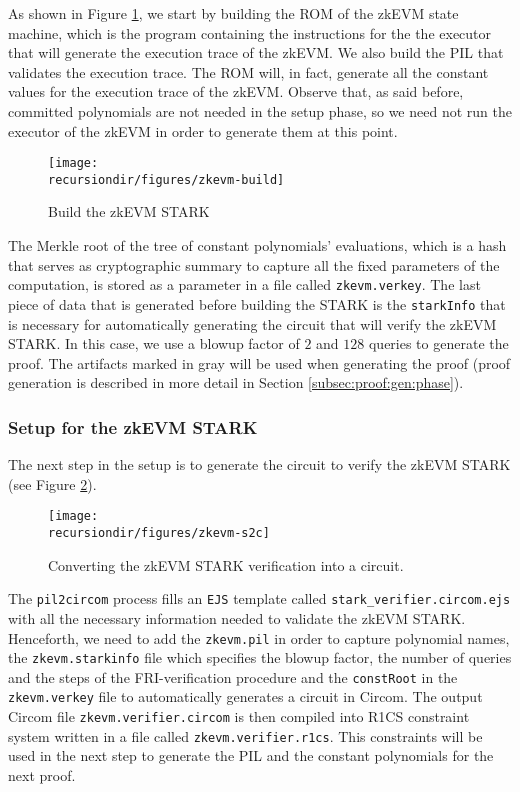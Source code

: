As shown in Figure \ref{fig:zkevm:build}, we start by building the ROM of the zkEVM state machine, which is the program containing the instructions for the the executor that will generate the execution trace of the zkEVM. We also build the PIL that validates the execution trace. The ROM will, in fact, generate all the constant values for the execution trace of the zkEVM. Observe that, as said before, committed polynomials are not needed in the setup phase, so we need not run the executor of the zkEVM in order to generate them at this point. 


\begin{figure}[H]
\centering
\texttt{[image: \\recursiondir/figures/zkevm-build]}
\caption{Build the zkEVM STARK}
\label{fig:zkevm:build}
\end{figure}

The Merkle root of the tree of constant polynomials' evaluations, which is a hash that serves as cryptographic summary to capture all the fixed parameters of the computation, is stored as a parameter in a file called \texttt{zkevm.verkey}.
The last piece of data that is generated before building the STARK is the \texttt{starkInfo} that is necessary for automatically generating the circuit that will verify the zkEVM STARK. 
In this case, we use a blowup factor of $2$ and $128$ queries to generate the proof. 
The artifacts marked in gray will be used when generating the proof (proof generation is described in more detail in Section \ref{subsec:proof:gen:phase}). 





\subsubsection{Setup \stoc for the zkEVM STARK}

The next step in the setup is to generate the circuit to verify the zkEVM STARK (see Figure \ref{fig:zkevm:s2c}). 

\begin{figure}[H]
\centering
\texttt{[image: \\recursiondir/figures/zkevm-s2c]}
\caption{Converting the zkEVM STARK verification into a circuit.}
\label{fig:zkevm:s2c}
\end{figure}


The \texttt{pil2circom} process fills an \texttt{EJS} template called \texttt{stark\_verifier.circom.ejs} with all the necessary information needed to validate the zkEVM STARK. Henceforth, we need to add the \texttt{zkevm.pil} in order to capture polynomial names, the \texttt{zkevm.starkinfo} file which specifies the blowup factor, the number of queries and the steps of the FRI-verification procedure and the \texttt{constRoot} in the \texttt{zkevm.verkey} file to automatically generates a circuit in Circom. The output Circom file \texttt{zkevm.verifier.circom} is then compiled into R1CS constraint system written in a file called \texttt{zkevm.verifier.r1cs}. This constraints will be used in the next step to generate the PIL and the constant polynomials for the next proof. 


